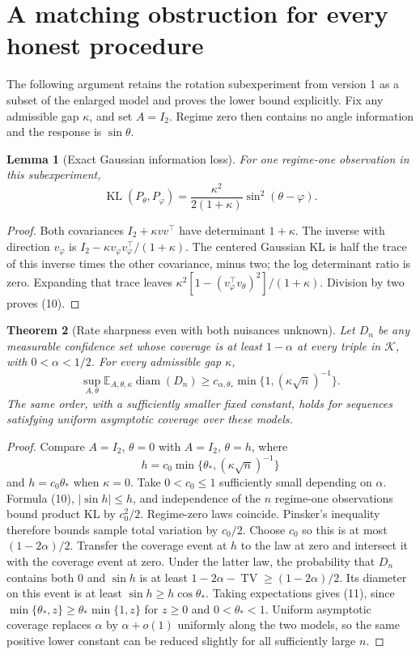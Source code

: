 \documentclass[11pt]{article}
\newtheorem{theorem}{Theorem}
\newtheorem{lemma}[theorem]{Lemma}
\theoremstyle{definition}
\begin{document}
\section*{A matching obstruction for every honest procedure}
The following argument retains the rotation subexperiment from version 1
as a subset of the enlarged model and proves the lower bound explicitly.
Fix any admissible gap $\kappa$, and set $A=I_2$. Regime zero then
contains no angle information and the response is $\sin\theta$.

\begin{lemma}[Exact Gaussian information loss]
For one regime-one observation in this subexperiment,
\[
 \operatorname{KL}(P_\theta,P_\varphi)
 =\frac{\kappa^2}{2(1+\kappa)}\sin^2(\theta-\varphi).
                                                        \tag{10}
\]
\end{lemma}
\begin{proof}
Both covariances $I_2+\kappa vv^\top$ have determinant $1+\kappa$.
The inverse with direction $v_\varphi$ is
$I_2-\kappa v_\varphi v_\varphi^\top/(1+\kappa)$.
The centered Gaussian KL is half the trace of this inverse times the
other covariance, minus two; the log determinant ratio is zero.
Expanding that trace leaves
$\kappa^2[1-(v_\varphi^\top v_\theta)^2]/(1+\kappa)$.
Division by two proves (10).
\end{proof}

\begin{theorem}[Rate sharpness even with both nuisances unknown]
Let $D_n$ be any measurable confidence set whose coverage is at least
$1-\alpha$ at every triple in $\mathcal K$, with $0<\alpha<1/2$.
For every admissible gap $\kappa$,
\[
 \sup_{A,\theta}\mathbb E_{A,\theta,\kappa}
                          \operatorname{diam}(D_n)
 \ge c_{\alpha,\theta_*}
                         \min\{1,(\kappa\sqrt n)^{-1}\}.
                                                        \tag{11}
\]
The same order, with a sufficiently smaller fixed constant, holds for
sequences satisfying uniform asymptotic coverage over these models.
\end{theorem}
\begin{proof}
Compare $A=I_2$, $\theta=0$ with $A=I_2$, $\theta=h$, where
\[
 h=c_0\min\{\theta_*,(\kappa\sqrt n)^{-1}\}
\]
and $h=c_0\theta_*$ when $\kappa=0$.
Take $0<c_0\le1$ sufficiently small depending on $\alpha$.
Formula (10), $|\sin h|\le h$, and independence of the $n$
regime-one observations bound product KL by $c_0^2/2$.
Regime-zero laws coincide. Pinsker's inequality therefore bounds sample
total variation by $c_0/2$. Choose $c_0$ so this is at most
$(1-2\alpha)/2$.
Transfer the coverage event at $h$ to the law at zero and intersect it
with the coverage event at zero. Under the latter law, the probability
that $D_n$ contains both $0$ and $\sin h$ is at least
$1-2\alpha-\operatorname{TV}\ge(1-2\alpha)/2$.
Its diameter on this event is at least
$\sin h\ge h\cos\theta_*$. Taking expectations gives (11), since
$\min\{\theta_*,z\}\ge\theta_*\min\{1,z\}$ for
$z\ge0$ and $0<\theta_*<1$.
Uniform asymptotic coverage replaces $\alpha$ by $\alpha+o(1)$
uniformly along the two models, so the same positive lower constant
can be reduced slightly for all sufficiently large $n$.
\end{proof}
\end{document}
